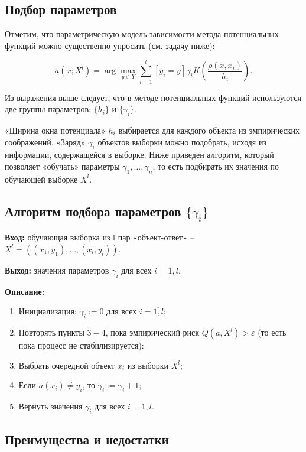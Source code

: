 \subsection{Подбор параметров}

Отметим, что параметрическую модель зависимости метода потенциальных функций можно существенно упросить (см. задачу ниже):

\begin{equation*}
	\displaystyle a(x; X^l) = \arg\max_{y\in Y} \sum\limits_{i=1}^l[y_i=y]\gamma_i K\left(\frac{\rho(x, x_i)}{h_i}\right).
\end{equation*}

Из выражения выше следует, что в методе потенциальных функций используются две группы параметров: $\{h_i\}$ и $\{\gamma_i\}$.

«Ширина окна потенциала» $h_i$ выбирается для каждого объекта из эмпирических соображений. «Заряд» $\gamma_i$ объектов выборки можно подобрать, исходя из информации, содержащейся в выборке. Ниже приведен алгоритм, который позволяет «обучать» параметры $\gamma_1, \dots, \gamma_n$, то есть подбирать их значения по обучающей выборке $X^l$.

\subsection*{Алгоритм подбора параметров $\{\gamma_i\}$}

\noindent \textbf{Вход:} обучающая выборка из l пар «объект-ответ» -- $X^l=\left((x_1,y_1), \dots, (x_l,y_l) \right)$.

\noindent \textbf{Выход:} значения параметров $\gamma_i$ для всех $i=\overline{1,l}$.

\noindent \textbf{Описание:}

\begin{enumerate}
	\item  Инициализация: $\gamma_i:=0$ для всех $i=\overline{1,l}$; 
	\item Повторять пункты $3-4$, пока эмпирический риск $Q(a,X^l) > \varepsilon$ (то есть пока процесс не стабилизируется):  
	\item Выбрать очередной объект $x_i$ из выборки $X^l$;
	\item Если $a(x_i) \not= y_i$, то $\gamma_i:=\gamma_i+1$;
	\item Вернуть значения $\gamma_i$ для всех $i=\overline{1,l}$.
\end{enumerate}

\subsection{Преимущества и недостатки}

